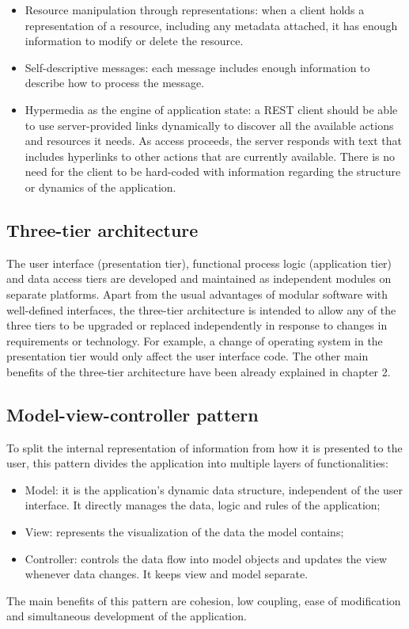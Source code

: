 \documentclass[12pt,a4paper]{report}
\begin{document}
\begin{itemize}
\begin{itemize}
		\item{Resource manipulation through representations}: when a client holds a representation of a resource, including any metadata attached, it has enough information to modify or delete the resource.
		\item{Self-descriptive messages}: each message includes enough information to describe how to process the message.
		\item{Hypermedia as the engine of application state}: a REST client should be able to use server-provided links dynamically to discover all the available actions and resources it needs. As access proceeds, the server responds with text that includes hyperlinks to other actions that are currently available. There is no need for the client to be hard-coded with information regarding the structure or dynamics of the application.
	\end{itemize}
	\end{itemize}
\subsection{Three-tier architecture}
The user interface (presentation tier), functional process logic (application tier) and data access tiers are developed and maintained as independent modules on separate platforms. Apart from the usual advantages of modular software with well-defined interfaces, the three-tier architecture is intended to allow any of the three tiers to be upgraded or replaced independently in response to changes in requirements or technology. For example, a change of operating system in the presentation tier would only affect the user interface code. The other main benefits of the three-tier architecture have been already explained in chapter 2.
\subsection{Model-view-controller pattern}
To split the internal representation of information from how it is presented to the user, this pattern divides the application into multiple layers of functionalities: 
\begin{itemize}
\item{Model}: it is the application's dynamic data structure, independent of the user interface. It directly manages the data, logic and rules of the application;
\item{View}: represents the visualization of the data the model contains;
\item{Controller}: controls the data flow into model objects and updates the view whenever data changes. It keeps view and model separate.
\end{itemize}
The main benefits of this pattern are cohesion, low coupling, ease of modification and simultaneous development of the application.
\end{document}
